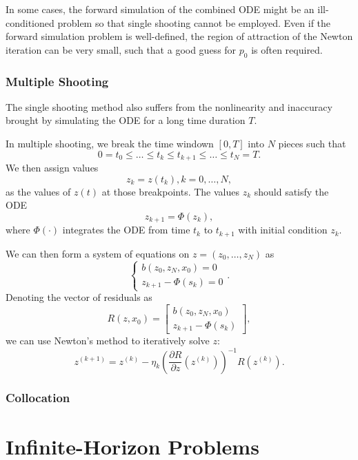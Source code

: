 \documentclass[
]{book}
\theoremstyle{definition}
\theoremstyle{definition}
\theoremstyle{definition}
\theoremstyle{definition}
\theoremstyle{remark}
\begin{document}
In some cases, the forward simulation of the combined ODE might be an ill-conditioned problem so that single shooting cannot be employed. Even if the forward simulation problem is well-defined, the region of attraction of the Newton iteration can be very small, such that a good guess for \(p_0\) is often required.

\hypertarget{multiple-shooting}{%
\subsubsection{Multiple Shooting}\label{multiple-shooting}}

The single shooting method also suffers from the nonlinearity and inaccuracy brought by simulating the ODE for a long time duration \(T\).

In multiple shooting, we break the time windown \([0,T]\) into \(N\) pieces such that
\[
0 = t_0 \leq \dots \leq t_k \leq t_{k+1} \leq \dots \leq t_N = T.
\]
We then assign values
\[
z_k = z(t_k), k = 0,\dots,N,
\]
as the values of \(z(t)\) at those breakpoints. The values \(z_k\) should satisfy the ODE
\[
z_{k+1} = \Phi(z_k),
\]
where \(\Phi(\cdot)\) integrates the ODE from time \(t_k\) to \(t_{k+1}\) with initial condition \(z_k\).

We can then form a system of equations on \(z=(z_0,\dots,z_N)\) as
\begin{equation}
\begin{cases}
b(z_0,z_N,x_0) = 0 \\
z_{k+1} - \Phi(s_k) = 0 
\end{cases}.
\end{equation}
Denoting the vector of residuals as
\[
R(z,x_0) = \begin{bmatrix} b(z_0,z_N,x_0) \\ z_{k+1} - \Phi(s_k) \end{bmatrix},
\]
we can use Newton's method to iteratively solve \(z\):
\begin{equation}
z^{(k+1)} = z^{(k)} - \eta_k \left( \frac{\partial R}{\partial z}(z^{(k)}) \right)^{-1} R(z^{(k)}).
\end{equation}

\hypertarget{collocation}{%
\subsubsection{Collocation}\label{collocation}}

\hypertarget{infinite-horizon-problems}{%
\section{Infinite-Horizon Problems}\label{infinite-horizon-problems}}
\end{document}
